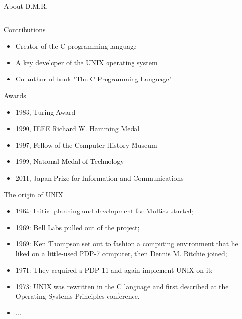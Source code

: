 \documentclass[CJK]{beamer}
\begin{document}
\begin{CJK*}{UTF8}{gbsn}
{\begin{frame}{About D.M.R.}
\begin{columns}
\end{columns}
	\begin{block}{Contributions}
		\begin{itemize}
			\item Creator of the C programming language
			\item A key developer of the UNIX operating system
			\item Co-author of  book "The C Programming Language" 
		\end{itemize}
	\end{block}
	\begin{block}{Awards}
		\begin{itemize}
			\item 1983, Turing Award
			\item 1990, IEEE Richard W. Hamming Medal
			\item 1997, Fellow of the Computer History Museum
			\item 1999, National Medal of Technology
			\item 2011, Japan Prize for Information and Communications
		\end{itemize}
	\end{block}
\end{frame}
}
\begin{frame}{The origin of UNIX}
	\begin{itemize}
		\item 1964: Initial planning and development for Multics started;
		\item 1969: Bell Labs pulled out of the project;
		\item 1969: Ken Thompson set out to fashion a computing environment that he liked on a little-used PDP-7 computer, then Dennis M. Ritchie joined;
		\item 1971: They acquired a PDP-11 and again implement UNIX on it;
		\item 1973: UNIX was rewritten in the C language and first described at the Operating Systems Principles conference.
		\item ...
	\end{itemize}
\end{frame}


\end{CJK*}
\end{document}

